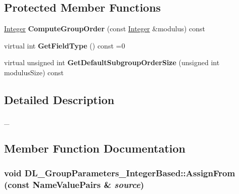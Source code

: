 \subsection*{Protected Member Functions}
\begin{DoxyCompactItemize}
\item 
\hypertarget{class_d_l___group_parameters___integer_based_a05c2b65749d0357845599a7d434e3903}{
\hyperlink{class_integer}{Integer} {\bfseries ComputeGroupOrder} (const \hyperlink{class_integer}{Integer} \&modulus) const }
\label{class_d_l___group_parameters___integer_based_a05c2b65749d0357845599a7d434e3903}

\item 
\hypertarget{class_d_l___group_parameters___integer_based_a33a9446de95ae6e78554efc981481bef}{
virtual int {\bfseries GetFieldType} () const =0}
\label{class_d_l___group_parameters___integer_based_a33a9446de95ae6e78554efc981481bef}

\item 
\hypertarget{class_d_l___group_parameters___integer_based_a0c98e0149ea0190b4f177c050b432d6d}{
virtual unsigned int {\bfseries GetDefaultSubgroupOrderSize} (unsigned int modulusSize) const }
\label{class_d_l___group_parameters___integer_based_a0c98e0149ea0190b4f177c050b432d6d}

\end{DoxyCompactItemize}


\subsection{Detailed Description}
\_\- 

\subsection{Member Function Documentation}
\hypertarget{class_d_l___group_parameters___integer_based_a151a76c88372bdf98c68be2ad19400e1}{
\subsubsection[{AssignFrom}]{\setlength{\rightskip}{0pt plus 5cm}void DL\_\-GroupParameters\_\-IntegerBased::AssignFrom (const {\bf NameValuePairs} \& {\em source})}}
\label{class_d_l___group_parameters___integer_based_a151a76c88372bdf98c68be2ad19400e1}


